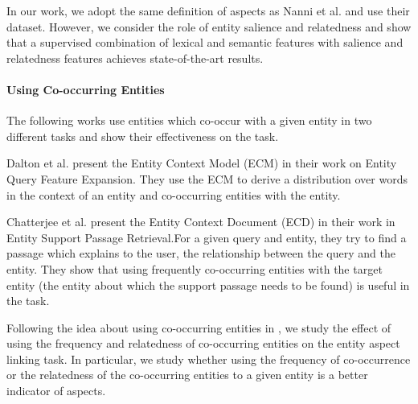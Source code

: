 In our work, we adopt the same definition of aspects as Nanni  et al. \cite{nanni2018entity} and use their dataset. However, we consider the role of entity salience and relatedness and show that a supervised combination of lexical and semantic features with salience and relatedness features achieves state-of-the-art results.

\paragraph{\textbf{Using Co-occurring Entities}}
The following works use entities which co-occur with a given entity in two different tasks and show their effectiveness on the task. 

Dalton et al. \cite{dalton2014entity} present the Entity Context Model (ECM) in their work on Entity Query Feature Expansion. They use the ECM to derive a distribution over words in the context of an entity and co-occurring entities with the entity.

Chatterjee et al. \cite{chatterjee2019why} present the Entity Context Document (ECD) in their work in Entity Support Passage Retrieval.For a given query and entity, they try to find a passage which explains to the user, the relationship between the query and the entity. They show that using frequently co-occurring entities with the target entity (the entity about which the support passage needs to be found) is useful in the task.

Following the idea about using co-occurring entities in \cite{dalton2014entity, chatterjee2019why}, we study the effect of using the frequency and relatedness of co-occurring entities on the entity aspect linking task. In particular, we study whether using the frequency of co-occurrence or the relatedness of the co-occurring entities to a given entity is a better indicator of aspects. 

